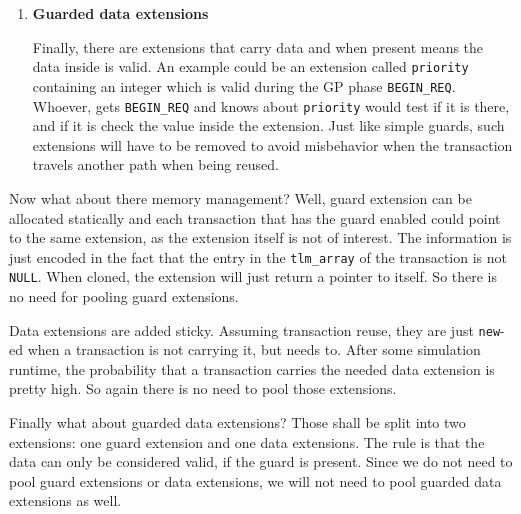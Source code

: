 \documentclass[a4paper,10pt]{article}          %
\begin{document}
\begin{enumerate}
\item \textbf{Guarded data extensions}

Finally, there are extensions that carry data and when present means the data inside is valid. An example could be an extension called \verb|priority| containing an integer which is valid during the GP phase \verb|BEGIN_REQ|. Whoever, gets \verb|BEGIN_REQ| and knows about \verb|priority| would test if it is there, and if it is check the value inside the extension. Just like simple guards, such extensions will have to be removed to avoid misbehavior when the transaction travels another path when being reused.
\end{enumerate}

Now what about there memory management? Well, guard extension can be allocated statically and each transaction that has the guard enabled could point to the same extension, as the extension itself is not of interest. The information is just encoded in the fact that the entry in the \verb|tlm_array| of the transaction is not \verb|NULL|. When cloned, the extension will just return a pointer to itself. So there is no need for pooling guard extensions.

Data extensions are added sticky. Assuming transaction reuse, they are just \verb|new|-ed when a transaction is not carrying it, but needs to. After some simulation runtime, the probability that a transaction carries the needed data extension is pretty high. So again there is no need to pool those extensions.

Finally what about guarded data extensions? Those shall be split into two extensions: one guard extension and one data extensions. The rule is that the data can only be considered valid, if the guard is present. Since we do not need to pool guard extensions or data extensions, we will not need to pool guarded data extensions as well.


\end{document}
